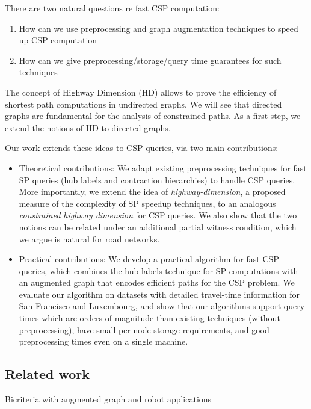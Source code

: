 \noindent There are two natural questions re fast CSP computation:
\begin{enumerate}[nosep,leftmargin=*]
\item How can we use preprocessing and graph augmentation techniques to speed up CSP computation 
\item How can we give preprocessing/storage/query time guarantees for such techniques
\end{enumerate}
The concept of Highway Dimension (HD) \cite{highway2010,highway2013} allows to prove the efficiency of shortest path computations in undirected graphs.
We will see that directed graphs are fundamental for the analysis of constrained paths.
As a first step, we extend the notions of HD to directed graphs.

Our work extends these ideas to CSP queries, via two main contributions:  
\begin{itemize}[nosep,leftmargin=*]
	\item Theoretical contributions: We adapt existing preprocessing techniques for fast SP queries (hub labels and contraction hierarchies) to handle CSP queries. More importantly, we extend the idea of \emph{highway-dimension}, a proposed measure of the complexity of SP speedup techniques, to an analogous \emph{constrained highway dimension} for CSP queries.
	We also show that the two notions can be related under an additional partial witness condition, which we argue is natural for road networks.
	\item Practical contributions: We develop a practical algorithm for fast CSP queries, which combines the hub labels technique for SP computations with an augmented graph that encodes efficient paths for the CSP problem. We evaluate our algorithm on datasets with detailed travel-time information for San Francisco and Luxembourg, and show that our algorithms support query times which are orders of magnitude than existing techniques (without preprocessing), have small per-node storage requirements, and good preprocessing times even on a single machine. 
\end{itemize}	


\subsection{Related work}

Bicriteria with augmented graph and robot applications \cite{alex_bicriteria}

